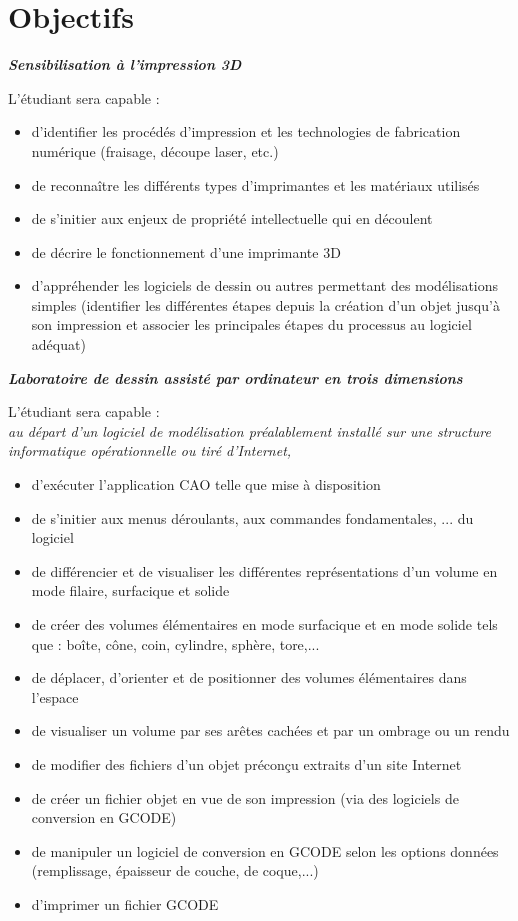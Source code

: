 \documentclass{article}
\begin{document}
\part{Objectifs}
\begin{flushleft}
\textbf{\textit{Sensibilisation à l'impression 3D}}\hfill \break

L'étudiant sera capable :
\begin{itemize}
\item d'identifier les procédés d'impression et les technologies de fabrication numérique (fraisage, découpe laser, etc.)
\item de reconnaître les différents types d'imprimantes et les matériaux utilisés
\item de s'initier aux enjeux de propriété intellectuelle qui en découlent
\item de décrire le fonctionnement d'une imprimante 3D
\item d'appréhender les logiciels de dessin ou autres permettant des modélisations simples (identifier les différentes étapes depuis la création d'un objet jusqu'à son impression et associer les principales étapes du processus au logiciel adéquat)
\end{itemize}
\end{flushleft}

\begin{flushleft}
\textbf{\textit{Laboratoire de dessin assisté par ordinateur en trois dimensions}}\hfill \break

L'étudiant sera capable :\\
\textit{au départ d'un logiciel de modélisation préalablement installé sur une structure informatique opérationnelle ou tiré d'Internet,}
\begin{itemize}
\item d'exécuter l'application CAO telle que mise à disposition
\item de s'initier aux menus déroulants, aux commandes fondamentales, ... du logiciel
\item de différencier et de visualiser les différentes représentations d'un volume en mode filaire, surfacique et solide
\item de créer des volumes élémentaires en mode surfacique et en mode solide tels que : boîte, cône, coin, cylindre, sphère, tore,...
\item de déplacer, d'orienter et de positionner des volumes élémentaires dans l'espace
\item de visualiser un volume par ses arêtes cachées et par un ombrage ou un rendu
\item de modifier des fichiers d'un objet préconçu extraits d'un site Internet
\item de créer un fichier objet en vue de son impression (via des logiciels de conversion en GCODE)
\item de manipuler un logiciel de conversion en GCODE selon les options données (remplissage, épaisseur de couche, de coque,...)
\item d'imprimer un fichier GCODE
\end{itemize}
\end{flushleft}
\end{document}
